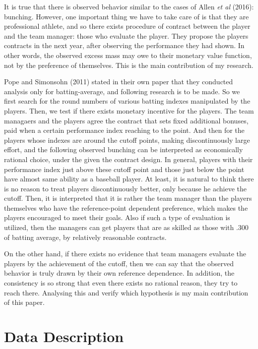 \documentclass[dvipdfmx, 12pt]{article}
\begin{document}
It is true that there is observed behavior similar to the cases of  Allen \textit{et al} (2016): bunching. However, one important thing we have to take care of is that they are professional athlete, and so there exists procedure of contract between the player and the team manager: those who evaluate the player. They propose the players contracts in the next year, after observing the performance they had shown. In other words, the observed excess mass may owe to their monetary value function, not by the preference of themselves. This is the main contribution of my research.

Pope and Simonsohn (2011) stated in their own paper that they conducted analysis only for batting-average, and following research is to be made. So we first search for the round numbers of various batting indexes manipulated by the players. Then, we test if there exists monetary incentive for the players. The team managaers and the players agree the contract that sets fixed additional bonuses, paid when a certain performance index reaching to the point. And then for the players whose indexes are around the cutoff points, making discontinuously large effort, and the following observed bunching can be interpreted as economically rational choice, under the given the contract design. In general, players with their performance index just above these cutoff point and those just below the point have almost same ability as a baseball player. At least, it is natural to think there is no reason to treat players discontinuously better, only because he achieve the cutoff. Then, it is interpreted that it is rather the team manager than the players themselves who have the reference-point dependent preference, which makes the players encouraged to meet their goals. Also if such a type of evaluation is utilized, then the managers can get players that are as skilled as those with .300 of batting average, by relatively reasonable contracts.

On the other hand, if there exists no evidence that team managers evaluate the players by the achievement of the cutoff, then we can say that the observed behavior is truly drawn by their own reference dependence. In addition, the consistency is so strong that even there exists no rational reason, they try to reach there. Analysing this and verify which hypothesis is my main contribution of this paper.

\section{Data Description}
\end{document}
